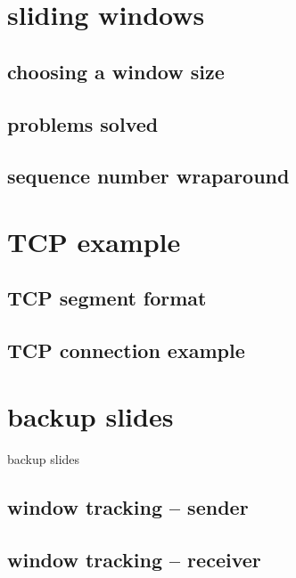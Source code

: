 \section{sliding windows}
\subsection{choosing a window size}


\subsection{problems solved}


\subsection{sequence number wraparound}


\section{TCP example}

\subsection{TCP segment format}


%

\subsection{TCP connection example}




\section{backup slides}
\begin{frame}{backup slides}
\end{frame}

\subsection{window tracking -- sender}


\subsection{window tracking -- receiver}




